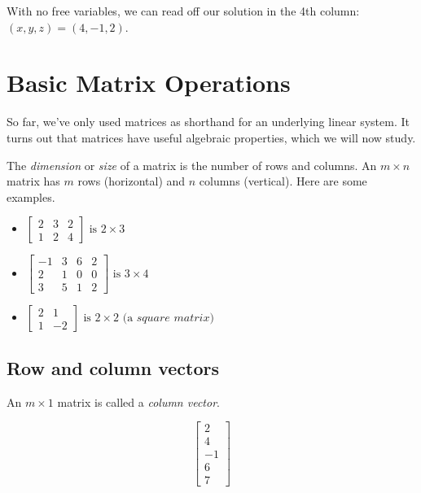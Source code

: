 \documentclass[
]{book}
\theoremstyle{definition}
\theoremstyle{definition}
\theoremstyle{definition}
\theoremstyle{definition}
\theoremstyle{remark}
\begin{document}
With no free variables, we can read off our solution in the 4th column: \({(x,y,z)=(4,-1,2)}\).

\section{Basic Matrix Operations}\label{BMO}

So far, we've only used matrices as shorthand for an underlying linear system. It turns out that matrices have useful algebraic properties, which we will now study.

The \emph{dimension} or \emph{size} of a matrix is the number of rows and columns. An \(m\times n\) matrix has \(m\) rows (horizontal) and \(n\) columns (vertical). Here are some examples.

\begin{itemize}
\item
  \(\begin{bmatrix}
  2 & 3 & 2\\
  1 & 2 & 4
  \end{bmatrix} {\text{ is } 2\times 3}\)
\item
  \(\begin{bmatrix}
  -1 & 3 & 6 & 2\\
  2 & 1 & 0 & 0\\
  3 & 5 & 1 & 2
  \end{bmatrix}{\text{ is } 3\times 4}\)
\item
  \(\begin{bmatrix}
  2 & 1 \\
  1 & -2
  \end{bmatrix}{\text{ is } 2\times 2 \text{ (a } \textit{square matrix}\text{)}}\)
\end{itemize}

\subsection*{Row and column vectors}\label{row-and-column-vectors}

An \(m\times 1\) matrix is called a \emph{column vector}.

\[\begin{bmatrix}
2\\4\\-1\\6\\7
\end{bmatrix} \]
\end{document}
